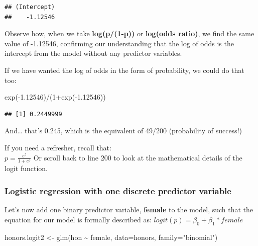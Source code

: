 \documentclass[
]{article}
\newenvironment{Shaded}{\begin{snugshade}}{\end{snugshade}}
\newcommand{\AttributeTok}[1]{\textcolor[rgb]{0.77,0.63,0.00}{#1}}
\newcommand{\DecValTok}[1]{\textcolor[rgb]{0.00,0.00,0.81}{#1}}
\newcommand{\FloatTok}[1]{\textcolor[rgb]{0.00,0.00,0.81}{#1}}
\newcommand{\FunctionTok}[1]{\textcolor[rgb]{0.00,0.00,0.00}{#1}}
\newcommand{\NormalTok}[1]{#1}
\newcommand{\OtherTok}[1]{\textcolor[rgb]{0.56,0.35,0.01}{#1}}
\newcommand{\SpecialCharTok}[1]{\textcolor[rgb]{0.00,0.00,0.00}{#1}}
\newcommand{\StringTok}[1]{\textcolor[rgb]{0.31,0.60,0.02}{#1}}
\begin{document}
\begin{verbatim}
## (Intercept) 
##    -1.12546
\end{verbatim}

Observe how, when we take \textbf{log(p/(1-p))} or \textbf{log(odds
ratio)}, we find the same value of -1.12546, confirming our
understanding that the log of odds is the intercept from the model
without any predictor variables.

If we have wanted the log of odds in the form of probability, we could
do that too:

\begin{Shaded}
\begin{Highlighting}[]
\FunctionTok{exp}\NormalTok{(}\SpecialCharTok{{-}}\FloatTok{1.12546}\NormalTok{)}\SpecialCharTok{/}\NormalTok{(}\DecValTok{1}\SpecialCharTok{+}\FunctionTok{exp}\NormalTok{(}\SpecialCharTok{{-}}\FloatTok{1.12546}\NormalTok{))}
\end{Highlighting}
\end{Shaded}

\begin{verbatim}
## [1] 0.2449999
\end{verbatim}

And\ldots{} that's 0.245, which is the equivalent of 49/200 (probability
of success!)

If you need a refresher, recall that:\\
\(p = \frac{e^z}{1+e^z}\) Or scroll back to line 200 to look at the
mathematical details of the logit function.

\hypertarget{logistic-regression-with-one-discrete-predictor-variable}{%
\subsubsection{Logistic regression with one discrete predictor
variable}\label{logistic-regression-with-one-discrete-predictor-variable}}

Let's now add one binary predictor variable, \textbf{female} to the
model, such that the equation for our model is formally described as:
\(logit(p) = \beta_0 + \beta_1 * female\)

\begin{Shaded}
\begin{Highlighting}[]
\NormalTok{honors.logit2 }\OtherTok{\textless{}{-}} \FunctionTok{glm}\NormalTok{(hon }\SpecialCharTok{\textasciitilde{}}\NormalTok{ female, }\AttributeTok{data=}\NormalTok{honors, }\AttributeTok{family=}\StringTok{"binomial"}\NormalTok{)}
\end{Highlighting}
\end{Shaded}
\end{document}
